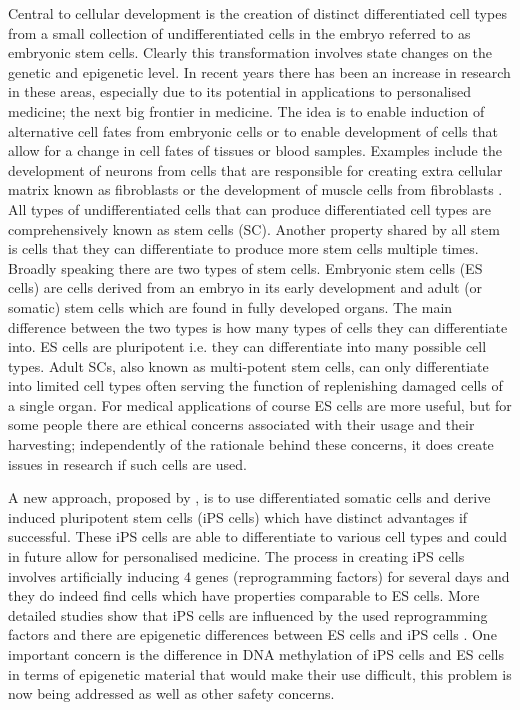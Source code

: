 Central to cellular development is the creation of distinct differentiated cell types from a small collection of undifferentiated cells in the embryo referred to as embryonic stem cells. Clearly this transformation involves state changes on the genetic and epigenetic level. In recent years there has been an increase in research in these areas, especially due to its potential in applications to personalised medicine; the next big frontier in medicine. The idea is to enable induction of alternative cell fates from embryonic cells or to enable development of cells that allow for a change in cell fates of tissues or blood samples. Examples include the development of neurons from cells that are responsible for creating extra cellular matrix known as fibroblasts \citep{Vierbuchen:2010fa, Pang:2011ce} or the development of muscle cells from fibroblasts \citep{Ieda:2010ir, Efe:2011bpa}. All types of undifferentiated cells that can produce differentiated cell types are comprehensively known as stem cells (SC). Another property shared by all stem is cells that they can differentiate to produce more stem cells multiple times. Broadly speaking there are two types of stem cells. Embryonic stem cells (ES cells) are cells derived from an embryo in its early development and  adult (or somatic) stem cells which are found in fully developed organs. The main difference between the two types is how many types of cells they can differentiate into. ES cells are pluripotent i.e. they can differentiate into many possible cell types. Adult SCs, also known as multi-potent stem cells, can only differentiate into limited cell types often serving the function of replenishing damaged cells of a single organ. For medical applications of course ES cells are more useful, but for some people there are ethical concerns associated with their usage and their harvesting; independently of the rationale behind these concerns, it does create issues in research if such cells are used.

A new approach, proposed by \cite{Takahashi:2006hi}, is to use differentiated somatic cells and derive induced pluripotent stem cells (iPS cells) which have distinct advantages if successful. These iPS cells are able to differentiate to various cell types and could in future allow for personalised medicine. The process in creating iPS cells involves artificially inducing $4$ genes (reprogramming factors) for several days and they do indeed find cells which have properties comparable to ES cells. More detailed studies show that iPS cells are influenced by the used reprogramming factors and there are epigenetic differences between ES cells and iPS cells \citep{Carey:2011bs, Bock:2011kx}. One important concern is the difference in DNA methylation of iPS cells and ES cells in terms of epigenetic material that would make their use difficult, this problem is now being addressed \citep{Bagci:2013ey} as well as other safety concerns.

